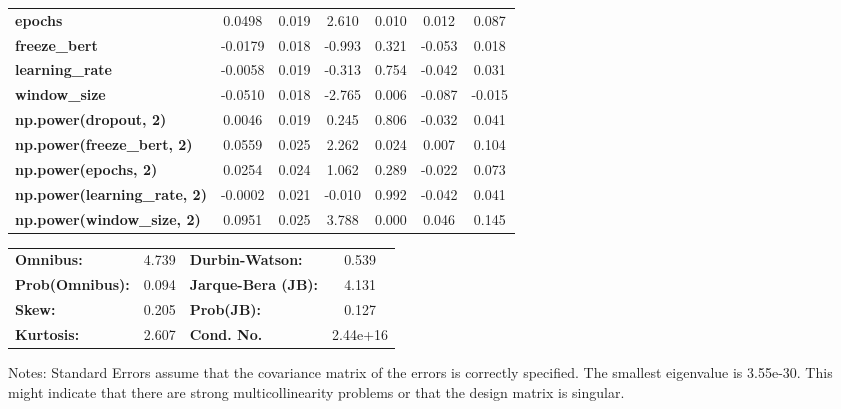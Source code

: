 \begin{center}
\begin{tabular}{lcccccc}
\textbf{epochs}                            &       0.0498  &        0.019     &     2.610  &         0.010        &        0.012    &        0.087     \\
\textbf{freeze\_bert}                      &      -0.0179  &        0.018     &    -0.993  &         0.321        &       -0.053    &        0.018     \\
\textbf{learning\_rate}                    &      -0.0058  &        0.019     &    -0.313  &         0.754        &       -0.042    &        0.031     \\
\textbf{window\_size}                      &      -0.0510  &        0.018     &    -2.765  &         0.006        &       -0.087    &       -0.015     \\
\textbf{np.power(dropout, 2)}              &       0.0046  &        0.019     &     0.245  &         0.806        &       -0.032    &        0.041     \\
\textbf{np.power(freeze\_bert, 2)}         &       0.0559  &        0.025     &     2.262  &         0.024        &        0.007    &        0.104     \\
\textbf{np.power(epochs, 2)}               &       0.0254  &        0.024     &     1.062  &         0.289        &       -0.022    &        0.073     \\
\textbf{np.power(learning\_rate, 2)}       &      -0.0002  &        0.021     &    -0.010  &         0.992        &       -0.042    &        0.041     \\
\textbf{np.power(window\_size, 2)}         &       0.0951  &        0.025     &     3.788  &         0.000        &        0.046    &        0.145     \\
\bottomrule
\end{tabular}
\begin{tabular}{lclc}
\textbf{Omnibus:}       &  4.739 & \textbf{  Durbin-Watson:     } &    0.539  \\
\textbf{Prob(Omnibus):} &  0.094 & \textbf{  Jarque-Bera (JB):  } &    4.131  \\
\textbf{Skew:}          &  0.205 & \textbf{  Prob(JB):          } &    0.127  \\
\textbf{Kurtosis:}      &  2.607 & \textbf{  Cond. No.          } & 2.44e+16  \\
\bottomrule
\end{tabular}
\end{center}

Notes: \newline
 [1] Standard Errors assume that the covariance matrix of the errors is correctly specified. \newline
 [2] The smallest eigenvalue is 3.55e-30. This might indicate that there are \newline
 strong multicollinearity problems or that the design matrix is singular.